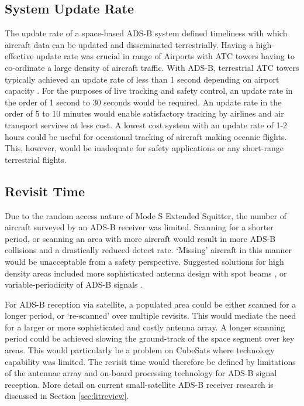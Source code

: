 \subsection{System Update Rate}
The update rate of a space-based ADS-B system defined timeliness with which aircraft data can be updated and disseminated terrestrially. Having a high-effective update rate was crucial in range of Airports with ATC towers having to co-ordinate a large density of aircraft traffic. With ADS-B, terrestrial ATC towers typically achieved an update rate of less than 1 second depending on airport capacity \cite{Orlando2001}. For the purposes of live tracking and safety control, an update rate in the order of 1 second to 30 seconds would be required. An update rate in the order of 5 to 10 minutes would enable satisfactory tracking by airlines and air transport services at less cost. A lowest cost system with an update rate of 1-2 hours could be useful for occasional tracking of aircraft making oceanic flights. This, however, would be inadequate for safety applications or any short-range terrestrial flights. 

\subsection{Revisit Time}
Due to the random access nature of Mode S Extended Squitter, the number of aircraft surveyed by an ADS-B receiver was limited. Scanning for a shorter period, or scanning an area with more aircraft would result in more ADS-B collisions and a drastically reduced detect rate. `Missing' aircraft in this manner would be unacceptable from a safety perspective. Suggested solutions for high density areas included more sophisticated antenna design with spot beams \cite{Blomenhofer2012}, or variable-periodicity of ADS-B signals \cite{Orlando2001}. 

For ADS-B reception via satellite, a populated area could be either scanned for a longer period, or `re-scanned' over multiple revisits. This would mediate the need for a larger or more sophisticated and costly antenna array. A longer scanning period could be achieved slowing the ground-track of the space segment over key areas. This would particularly be a problem on CubeSats where technology capability was limited. The revisit time would therefore be defined by limitations of the antennae array and on-board processing technology for ADS-B signal reception. More detail on current small-satellite ADS-B receiver research is discussed in Section \ref{sec:litreview}.
 
